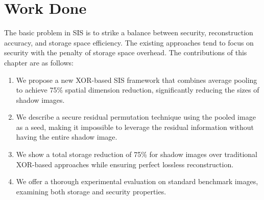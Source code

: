 \section{Work Done}
\label{sec:lad-work}
The basic problem in SIS is to strike a balance between security, reconstruction accuracy, and storage space efficiency. The existing approaches tend to focus on security with the penalty of storage space overhead. The contributions of this chapter are as follows:

\begin{enumerate}
\item We propose a new XOR-based SIS framework that combines average pooling to achieve 75\% spatial dimension reduction, significantly reducing the sizes of shadow images.

\item We describe a secure residual permutation technique using the pooled image as a seed, making it impossible to leverage the residual information without having the entire shadow image.

\item We show a total storage reduction of 75\% for shadow images over traditional XOR-based approaches while ensuring perfect lossless reconstruction.

\item We offer a thorough experimental evaluation on standard benchmark images, examining both storage and security properties.
\end{enumerate}

